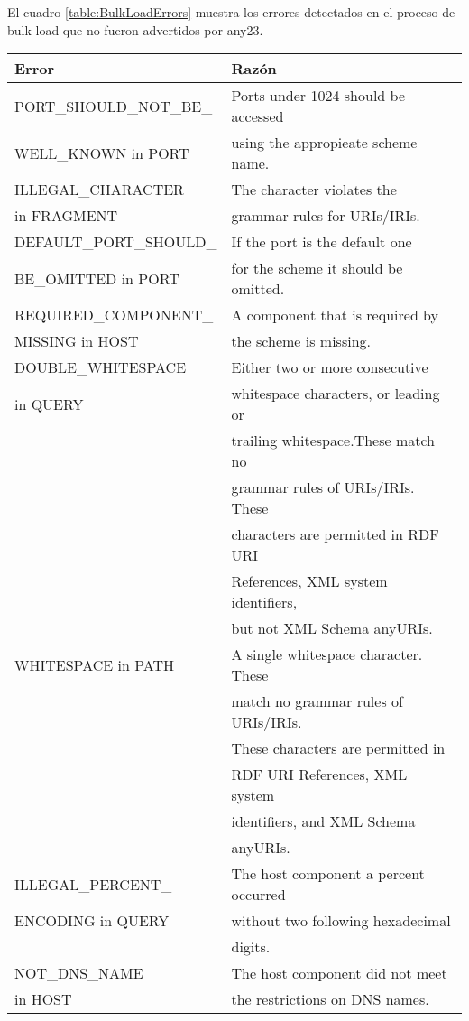 El cuadro \ref{table:BulkLoadErrors} muestra los errores detectados en el proceso de bulk load que no fueron advertidos por any23.\\
\begin{table}[h]
\begin{tabular}{| l | l | }\hline
Error & Razón \\\hline
PORT\_SHOULD\_NOT\_BE\_& Ports under 1024 should be accessed \\ WELL\_KNOWN  in PORT  & using the appropieate scheme name. \\\hline
ILLEGAL\_CHARACTER & The character violates the \\  in FRAGMENT & grammar rules for URIs/IRIs.\\\hline
DEFAULT\_PORT\_SHOULD\_& If the port is the default one \\ BE\_OMITTED in PORT  & for the scheme it should be omitted. \\\hline
REQUIRED\_COMPONENT\_& A component that is required by \\ MISSING in HOST & the scheme is missing.\\\hline
DOUBLE\_WHITESPACE& Either two or more consecutive \\  in QUERY  &  whitespace characters, or leading or \\ & trailing whitespace.These match no \\ & grammar rules  of URIs/IRIs. These \\ &  characters are  permitted in RDF URI \\ &  References, XML  system identifiers,\\ & but not XML Schema  anyURIs.\\\hline
WHITESPACE in PATH & A single whitespace character. These \\ &  match no grammar rules of URIs/IRIs. \\ &  These characters are permitted in \\ & RDF URI References, XML system \\ & identifiers, and XML Schema \\ & anyURIs.\\\hline
ILLEGAL\_PERCENT\_& The host component a percent occurred \\ ENCODING in QUERY  & without two following hexadecimal \\ & digits.\\\hline
NOT\_DNS\_NAME& The host component did not meet \\  in HOST  & the restrictions on DNS names.\\\hline

\end{tabular}
\end{table}
